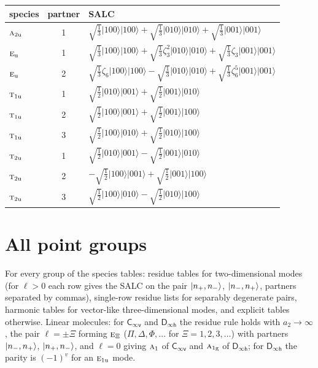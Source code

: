 \documentclass[11pt]{article}
\newcommand{\grp}[1]{\mathsf{#1}}
\newcommand{\irr}[1]{\text{\normalfont\scshape #1}}
\newcommand{\ptag}[1]{\mathrm{#1}}
\newcommand{\rootunity}[1]{\zeta_{#1}}
\newcommand{\occ}[1]{\lvert #1\rangle}
\begin{document}
\begin{longtable}{l c p{}}\hline species & partner & SALC\\ \hline\endhead

$\irr{a}_{2\ptag{u}}$ & 1 & $\sqrt{\tfrac{1}{3}}\occ{100}\occ{100}+\sqrt{\tfrac{1}{3}}\occ{010}\occ{010}+\sqrt{\tfrac{1}{3}}\occ{001}\occ{001}$\\

$\irr{e}_{\ptag{u}}$ & 1 & $\sqrt{\tfrac{1}{3}}\occ{100}\occ{100}+\sqrt{\tfrac{1}{3}}\rootunity{3}^{2}\occ{010}\occ{010}+\sqrt{\tfrac{1}{3}}\rootunity{3}\occ{001}\occ{001}$\\

$\irr{e}_{\ptag{u}}$ & 2 & $\sqrt{\tfrac{1}{3}}\rootunity{6}\occ{100}\occ{100}-\sqrt{\tfrac{1}{3}}\occ{010}\occ{010}+\sqrt{\tfrac{1}{3}}\rootunity{6}^{5}\occ{001}\occ{001}$\\

$\irr{t}_{1\ptag{u}}$ & 1 & $\sqrt{\tfrac{1}{2}}\occ{010}\occ{001}+\sqrt{\tfrac{1}{2}}\occ{001}\occ{010}$\\

$\irr{t}_{1\ptag{u}}$ & 2 & $\sqrt{\tfrac{1}{2}}\occ{100}\occ{001}+\sqrt{\tfrac{1}{2}}\occ{001}\occ{100}$\\

$\irr{t}_{1\ptag{u}}$ & 3 & $\sqrt{\tfrac{1}{2}}\occ{100}\occ{010}+\sqrt{\tfrac{1}{2}}\occ{010}\occ{100}$\\

$\irr{t}_{2\ptag{u}}$ & 1 & $\sqrt{\tfrac{1}{2}}\occ{010}\occ{001}-\sqrt{\tfrac{1}{2}}\occ{001}\occ{010}$\\

$\irr{t}_{2\ptag{u}}$ & 2 & $-\sqrt{\tfrac{1}{2}}\occ{100}\occ{001}+\sqrt{\tfrac{1}{2}}\occ{001}\occ{100}$\\

$\irr{t}_{2\ptag{u}}$ & 3 & $\sqrt{\tfrac{1}{2}}\occ{100}\occ{010}-\sqrt{\tfrac{1}{2}}\occ{010}\occ{100}$\\

\hline\end{longtable}

\clearpage\section{All point groups}\label{sec:groups}

For every group of the species tables: residue tables for two-dimensional modes (for $\ell>0$ each row gives the SALC on the pair $\ket{n_+,n_-}$, $\ket{n_-,n_+}$, partners separated by commas), single-row residue lists for separably degenerate pairs, harmonic tables for vector-like three-dimensional modes, and explicit tables otherwise. Linear molecules: for $\grp{C_{\infty v}}$ and $\grp{D_{\infty h}}$ the residue rule holds with $a_2\to\infty$, the pair $\ell=\pm\Xi$ forming $\irr{e}_{\Xi}$ ($\Pi,\Delta,\Phi,\ldots$ for $\Xi=1,2,3,\ldots$) with partners $\ket{n_-,n_+}$, $\ket{n_+,n_-}$, and $\ell=0$ giving $\irr{a}_{1}$ of $\grp{C_{\infty v}}$ and $\irr{a}_{1\ptag{g}}$ of $\grp{D_{\infty h}}$; for $\grp{D_{\infty h}}$ the parity is $(-1)^v$ for an $\irr{e}_{1\ptag{u}}$ mode.
\end{document}

